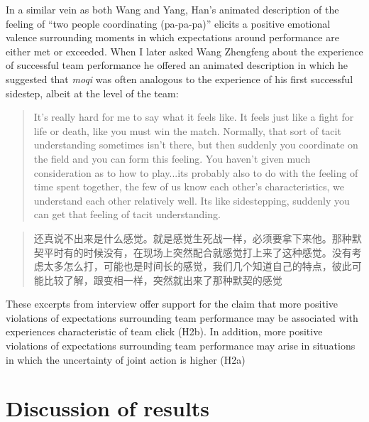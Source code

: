 \begin{CJK}{UTF8}{gbsn}
In a similar vein as both Wang and Yang, Han's animated description of the feeling of ``two people coordinating (pa-pa-pa)'' elicits a positive emotional valence surrounding moments in which expectations around performance are either met or exceeded. When I later asked Wang Zhengfeng about the experience of successful team performance he offered an animated description in which he suggested that \textit{moqi} was often analogous to the experience of his first successful sidestep, albeit at the level of the team:

  \begin{quote}
    It’s really hard for me to say what it feels like.  It feels just like a fight for life or death, like you must win the match.  Normally, that sort of tacit understanding sometimes isn’t there, but then suddenly you coordinate on the field and you can form this feeling.  You haven't given much consideration as to how to play...its probably also to do with the feeling of time spent together, the few of us know each other’s characteristics, we understand each other relatively well.  Its like sidestepping, suddenly you can get that feeling of tacit understanding.
  \end{quote}

  \begin{quote}
    还真说不出来是什么感觉。就是感觉生死战一样，必须要拿下来他。那种默契平时有的时候没有，在现场上突然配合就感觉打上来了这种感觉。没有考虑太多怎么打，可能也是时间长的感觉，我们几个知道自己的特点，彼此可能比较了解，跟变相一样，突然就出来了那种默契的感觉
  \end{quote}

These excerpts from interview offer support for the claim that more positive violations of expectations surrounding team performance may be associated with experiences characteristic of team click (H2b).  In addition, more positive violations of expectations surrounding team performance may arise in situations in which the uncertainty of joint action is higher (H2a)



\section{Discussion of results}


\end{CJK}

